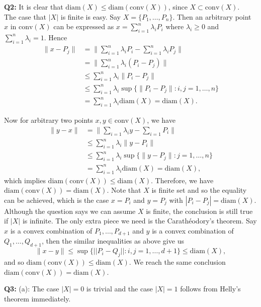 \documentclass[12pt,reqno]{amsart}
\theoremstyle{definition}
\newcommand{\conv}[1]{\mathrm{conv}(#1)}
\newcommand{\diam}[1]{\mathrm{diam}(#1)}
\begin{document}
\newpage

\noindent \textbf{Q2:} It is clear that $\diam{X}\leq \diam{\conv{X}}$, since $X\subset \conv{X}$.\\


The case that $|X|$ is finite is easy. Say $X=\{P_1,\dots,P_n\}$. Then an arbitrary point $x$ in $\conv{X}$ can be expressed as $x=\sum_{i=1}^n \lambda_i P_i$ where $\lambda_i\geq 0$ and $\sum_{i=1}^n\lambda_i=1$. Hence
\begin{align*}
  \|x-P_j\| & = \| \sum_{i=1}^n \lambda_i P_i -\sum_{i=1}^n\lambda_i P_j \|   \\
            & = \|\sum_{i=1}^n \lambda_i (P_i -P_j) \|                        \\
            & \leq \sum_{i=1}^n \lambda_i \|P_i -P_j \|                       \\
            & \leq \sum_{i=1}^n \lambda_i  \sup\{\|P_i-P_j\|: i,j=1,\dots,n\} \\
            & =\sum_{i=1}^n \lambda_i \diam{X} =\diam{X}.
\end{align*}

Now for arbitrary two points $x,y\in \conv{X}$, we have
\begin{align*}
  \|y-x\| & = \|\sum_{i=1} \lambda_i y-\sum_{i=1} P_i\|                \\
          & \leq \sum_{i=1}^n \lambda_i \|y-P_i\|                      \\
          & \leq \sum_{i=1}^n \lambda_i \sup\{\|y-P_j\|: j=1,\dots,n\} \\
          & =\sum_{i=1}^n \lambda_i \diam{X} =\diam{X},
\end{align*}
which implies $\diam{\conv{X}} \leq \diam{X}$. Therefore, we have $\diam{\conv{X}}=\diam{X}$. Note that $X$ is finite set and so the equality can be achieved, which is the case $x=P_i$ and $y=P_j$ with $|P_i-P_j|=\diam{X}$.\\


Although the question says we can assume $X$ is finite, the conclusion is still true if $|X|$ is infinite. The only extra piece we need is the Carath\'eodory's theorem. Say $x$ is a convex combination of $P_1,\dots,P_{d+1}$ and $y$ is a convex combination of $Q_1,\dots,Q_{d+1}$, then the similar inequalities as above give us $$\|x-y\| \leq \sup\{||P_i-Q_j||: i,j=1,\dots,d+1\} \leq \diam{X},$$ and so $\diam{\conv{X}} \leq \diam{X}$. We reach the same conclusion $\diam{\conv{X}}=\diam{X}$.

\newpage
\noindent \textbf{Q3:} (a): The case $|X|=0$ is trivial and the case $|X|=1$ follows from Helly's theorem immediately.
\end{document}
